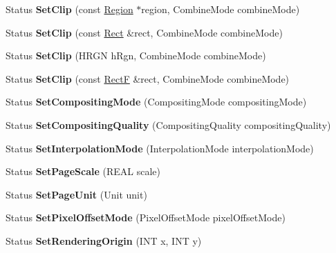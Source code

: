 \begin{DoxyCompactItemize}
Status {\bfseries Set\+Clip} (const \hyperlink{class_region}{Region} $\ast$region, Combine\+Mode combine\+Mode)
\item 
\mbox{\label{class_graphics_ad5f7625e050bd3565335d707792fbcc8}} 
Status {\bfseries Set\+Clip} (const \hyperlink{struct_rect}{Rect} \&rect, Combine\+Mode combine\+Mode)
\item 
\mbox{\label{class_graphics_af956659dece7469fc1815647516e546f}} 
Status {\bfseries Set\+Clip} (H\+R\+GN h\+Rgn, Combine\+Mode combine\+Mode)
\item 
\mbox{\label{class_graphics_aacbaa8cd3ceca05e63b561ae342dd400}} 
Status {\bfseries Set\+Clip} (const \hyperlink{struct_rect_f}{RectF} \&rect, Combine\+Mode combine\+Mode)
\item 
\mbox{\label{class_graphics_a11ba44c5e4ee08bee63f79c6d7125845}} 
Status {\bfseries Set\+Compositing\+Mode} (Compositing\+Mode compositing\+Mode)
\item 
\mbox{\label{class_graphics_ac1e675584d72a060e43777c4459ce7e4}} 
Status {\bfseries Set\+Compositing\+Quality} (Compositing\+Quality compositing\+Quality)
\item 
\mbox{\label{class_graphics_ad6f3904e83848ce7dd4a674bbe9300a5}} 
Status {\bfseries Set\+Interpolation\+Mode} (Interpolation\+Mode interpolation\+Mode)
\item 
\mbox{\label{class_graphics_a60ce99dc4e83b40dd45ccb1c7bf1294d}} 
Status {\bfseries Set\+Page\+Scale} (R\+E\+AL scale)
\item 
\mbox{\label{class_graphics_a2983375f573dead649511156d71189ad}} 
Status {\bfseries Set\+Page\+Unit} (Unit unit)
\item 
\mbox{\label{class_graphics_ab2864af9a8ecfaa6dd01f6b5c762f5bb}} 
Status {\bfseries Set\+Pixel\+Offset\+Mode} (Pixel\+Offset\+Mode pixel\+Offset\+Mode)
\item 
\mbox{\label{class_graphics_aef842228c28cbe316d077047609abce4}} 
Status {\bfseries Set\+Rendering\+Origin} (I\+NT x, I\+NT y)

\end{DoxyCompactItemize}
